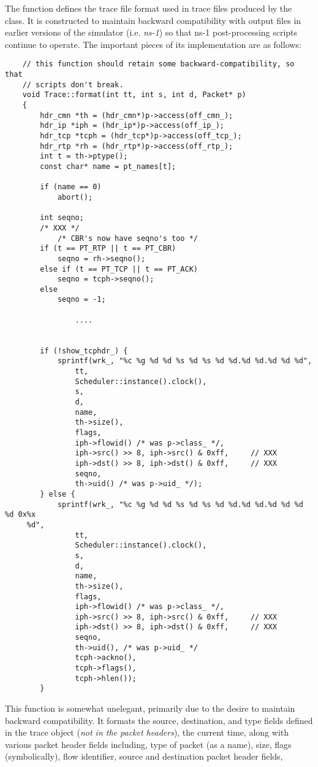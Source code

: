 The  function defines the trace file format used
in trace files produced by the  class.
It is constructed to maintain backward compatibility with output files
in earlier versions of the simulator (i.e. {\em ns-1}) so that ns-1
post-processing scripts continue to operate.
The important pieces of its implementation are as follows:
\begin{small}
\begin{verbatim}
	// this function should retain some backward-compatibility, so that
	// scripts don't break.
	void Trace::format(int tt, int s, int d, Packet* p)
	{
		hdr_cmn *th = (hdr_cmn*)p->access(off_cmn_);
		hdr_ip *iph = (hdr_ip*)p->access(off_ip_);
		hdr_tcp *tcph = (hdr_tcp*)p->access(off_tcp_);
		hdr_rtp *rh = (hdr_rtp*)p->access(off_rtp_);
		int t = th->ptype();
		const char* name = pt_names[t];

		if (name == 0)
			abort();

		int seqno;
		/* XXX */
			/* CBR's now have seqno's too */
		if (t == PT_RTP || t == PT_CBR)
			seqno = rh->seqno();
		else if (t == PT_TCP || t == PT_ACK)
			seqno = tcph->seqno();
		else
			seqno = -1;

                ....


		if (!show_tcphdr_) {
			sprintf(wrk_, "%c %g %d %d %s %d %s %d %d.%d %d.%d %d %d",
				tt,
				Scheduler::instance().clock(),
				s,
				d,
				name,
				th->size(),
				flags,
				iph->flowid() /* was p->class_ */,
				iph->src() >> 8, iph->src() & 0xff,     // XXX
				iph->dst() >> 8, iph->dst() & 0xff,     // XXX
				seqno,
				th->uid() /* was p->uid_ */);
		} else {
			sprintf(wrk_, "%c %g %d %d %s %d %s %d %d.%d %d.%d %d %d %d 0x%x
	 %d",
				tt,
				Scheduler::instance().clock(),
				s,
				d,
				name,
				th->size(),
				flags,
				iph->flowid() /* was p->class_ */,
				iph->src() >> 8, iph->src() & 0xff,     // XXX
				iph->dst() >> 8, iph->dst() & 0xff,     // XXX
				seqno,
				th->uid(), /* was p->uid_ */
				tcph->ackno(),
				tcph->flags(),
				tcph->hlen());
		}

\end{verbatim}
\end{small}
This function is somewhat unelegant, primarily due to the desire
to maintain backward compatibility.
It formats the source, destination, and type fields defined in the
trace object ({\em not in the packet headers}), the current time,
along with various packet header fields including,
type of packet (as a name), size, flags (symbolically),
flow identifier, source and destination packet header fields,
